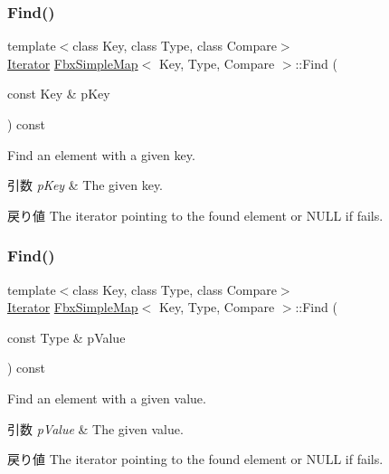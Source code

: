 \subsubsection{\texorpdfstring{Find()}{Find()}\hspace{0.1cm}{\footnotesize\ttfamily [1/2]}}
{\footnotesize\ttfamily template$<$class Key, class Type, class Compare$>$ \\
\hyperlink{class_fbx_simple_map_aaa589eb5e1ccdd11dffd018f3212e13e}{Iterator} \hyperlink{class_fbx_simple_map}{Fbx\+Simple\+Map}$<$ Key, Type, Compare $>$\+::Find (\begin{DoxyParamCaption}\item[{const Key \&}]{p\+Key }\end{DoxyParamCaption}) const}

Find an element with a given key. 
\begin{DoxyParams}{引数}
{\em p\+Key} & The given key. \\
\hline
\end{DoxyParams}
\begin{DoxyReturn}{戻り値}
The iterator pointing to the found element or N\+U\+LL if fails. 
\end{DoxyReturn}
\mbox{\label{class_fbx_simple_map_a5a015127a73c38a32b31a753e239159b}} 
\subsubsection{\texorpdfstring{Find()}{Find()}\hspace{0.1cm}{\footnotesize\ttfamily [2/2]}}
{\footnotesize\ttfamily template$<$class Key, class Type, class Compare$>$ \\
\hyperlink{class_fbx_simple_map_aaa589eb5e1ccdd11dffd018f3212e13e}{Iterator} \hyperlink{class_fbx_simple_map}{Fbx\+Simple\+Map}$<$ Key, Type, Compare $>$\+::Find (\begin{DoxyParamCaption}\item[{const Type \&}]{p\+Value }\end{DoxyParamCaption}) const}

Find an element with a given value. 
\begin{DoxyParams}{引数}
{\em p\+Value} & The given value. \\
\hline
\end{DoxyParams}
\begin{DoxyReturn}{戻り値}
The iterator pointing to the found element or N\+U\+LL if fails. 
\end{DoxyReturn}
\mbox{\label{class_fbx_simple_map_aa1d257d7da92eece92cbf1b04a959ea3}} 
